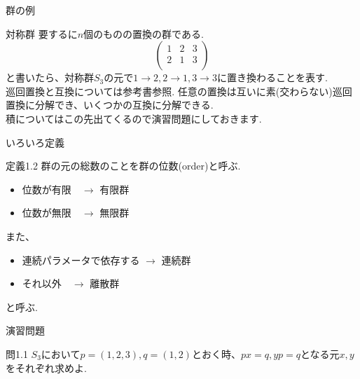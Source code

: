 \documentclass[dvipdfmx,11pt,notheorems]{beamer}
\begin{document}
\begin{frame}{群の例}
  \begin{exampleblock}{対称群}
    要するに$n$個のものの置換の群である. \\
    \begin{equation*}
      \begin{pmatrix}
        1 & 2 & 3 \\
        2 & 1 & 3 \\
      \end{pmatrix}
    \end{equation*}
    と書いたら、対称群$S_3$の元で$1\rightarrow 2,2\rightarrow1,3\rightarrow3$に置き換わることを表す. \\
    \alert{巡回置換}と\alert{互換}については参考書参照. 任意の置換は互いに素(交わらない)巡回置換に分解でき、いくつかの互換に分解できる. \\
    積についてはこの先出てくるので演習問題にしておきます.
  \end{exampleblock}
\end{frame}
\begin{frame}{いろいろ定義}
  \begin{block}{定義1.2}
    群の元の総数のことを群の\alert{位数}(order)と呼ぶ.
    \begin{itemize}
      \item 位数が有限　$\rightarrow$ \alert{有限群}
      \item 位数が無限　$\rightarrow$ \alert{無限群}
    \end{itemize}
    また、
    \begin{itemize}
      \item 連続パラメータで依存する $\rightarrow$ \alert{連続群}
      \item それ以外　$\rightarrow$ \alert{離散群}
    \end{itemize}
    と呼ぶ.
  \end{block}
\end{frame}
\begin{frame}{演習問題}
  \begin{exampleblock}{問1.1}
    $S_3$において$p=(1,2,3),q=(1,2)$とおく時、$px=q,yp=q$となる元$x,y$をそれぞれ求めよ.
  \end{exampleblock}
\end{frame}
\end{document}
